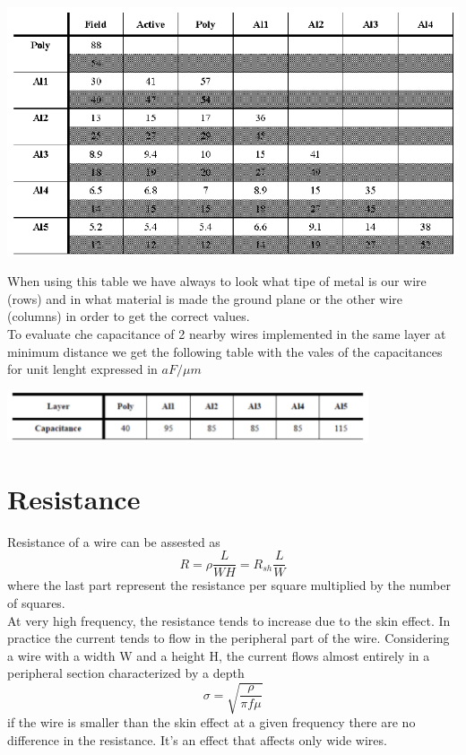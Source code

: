 \centering
\includegraphics[width=0.8  \textwidth]{C5_2.png}\\
\raggedright
When using this table we have always to look what tipe of metal is our wire (rows) and in what material is made the ground plane or the other wire (columns) in order to get the correct values.\\

\vspace{3mm}
To evaluate che capacitance of 2 nearby wires implemented in the same layer at minimum distance we get the following table with the vales of the capacitances for unit lenght expressed in $aF/\mu m$ \\
\vspace{3mm}

\centering
\includegraphics[width=0.8\textwidth]{C5_3.png}\\
\raggedright


\section{Resistance}

Resistance of a wire can be assested as
\begin{equation}
R=\rho \frac{L}{WH}=R_{sh}\frac{L}{W}
\end{equation} 
where the last part represent the resistance per square multiplied by the number of squares.\\
\vspace{5mm}
At very high frequency, the resistance tends to increase due to the skin effect. In practice the current tends to flow in the peripheral part of the wire. Considering a wire with a width W and a height H, the current flows almost entirely in a peripheral section characterized by a depth
\begin{equation}
\sigma=\sqrt{\frac{\rho}{\pi f \mu }}
\end{equation}
if the wire is smaller than the skin effect at a given frequency there are no difference in the resistance. It's an effect that affects only wide wires.\\


